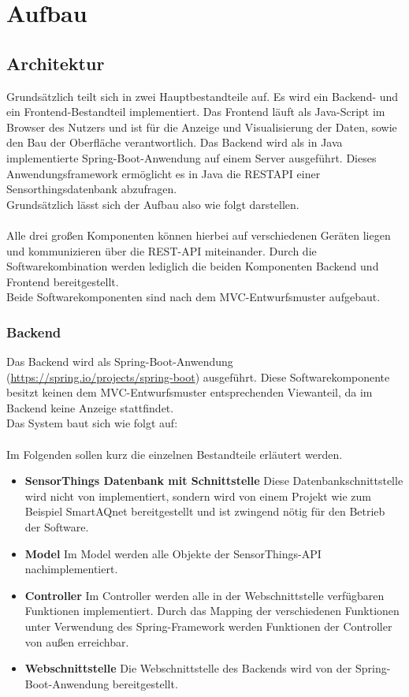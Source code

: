 \section{Aufbau}
\subsection{Architektur}
Grundsätzlich teilt sich \softwarename in zwei Hauptbestandteile auf.
Es wird ein Backend- und ein Frontend-Bestandteil implementiert.
Das Frontend läuft als Java-Script im Browser des Nutzers und ist für die Anzeige und Visualisierung der Daten, sowie den Bau der Oberfläche verantwortlich.
Das Backend wird als in Java implementierte Spring-Boot-Anwendung auf einem Server ausgeführt.
Dieses Anwendungsframework ermöglicht es in Java die \gls{RESTAPI} einer Sensorthingsdatenbank abzufragen.
\\
Grundsätzlich lässt sich der Aufbau also wie folgt darstellen.
\\

\\
Alle drei großen Komponenten können hierbei auf verschiedenen Geräten liegen und kommunizieren über die REST-API miteinander.
Durch die Softwarekombination \softwarename werden lediglich die beiden Komponenten \softwarename Backend und \softwarename Frontend bereitgestellt.
\\
Beide Softwarekomponenten sind nach dem \gls{MVC}-Entwurfsmuster aufgebaut.
\subsubsection{Backend}
Das Backend wird als Spring-Boot-Anwendung (\url{https://spring.io/projects/spring-boot}) ausgeführt.
Diese Softwarekomponente besitzt keinen dem MVC-Entwurfsmuster entsprechenden Viewanteil, da im Backend keine Anzeige stattfindet.
\\
Das System baut sich wie folgt auf:
\\

\\
Im Folgenden sollen kurz die einzelnen Bestandteile erläutert werden.
\begin{itemize}
    \item \textbf{SensorThings Datenbank mit Schnittstelle} Diese Datenbankschnittstelle wird nicht von \softwarename implementiert, sondern wird von einem Projekt wie zum Beispiel SmartAQnet bereitgestellt und ist zwingend nötig für den Betrieb der Software.
    \item \textbf{Model} Im Model werden alle Objekte der SensorThings-API nachimplementiert.
    \item \textbf{Controller} Im Controller werden alle in der Webschnittstelle verfügbaren Funktionen implementiert.
    Durch das Mapping der verschiedenen Funktionen unter Verwendung des Spring-Framework werden Funktionen der Controller von außen erreichbar.
    \item \textbf{Webschnittstelle} Die Webschnittstelle des Backends wird von der Spring-Boot-Anwendung bereitgestellt.
\end{itemize}
\clearpage
